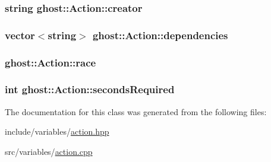 \hypertarget{classghost_1_1Action_ab4862cbb4a415783306abbd1a2c57472}{
\subsubsection[{creator}]{\setlength{\rightskip}{0pt plus 5cm}string ghost\-::\-Action\-::creator\hspace{0.3cm}{\ttfamily [private]}}}\label{classghost_1_1Action_ab4862cbb4a415783306abbd1a2c57472}
\hypertarget{classghost_1_1Action_a0e7e5f84cc8d24bed8d83021602b02c2}{
\subsubsection[{dependencies}]{\setlength{\rightskip}{0pt plus 5cm}vector$<$string$>$ ghost\-::\-Action\-::dependencies\hspace{0.3cm}{\ttfamily [private]}}}\label{classghost_1_1Action_a0e7e5f84cc8d24bed8d83021602b02c2}
\hypertarget{classghost_1_1Action_a040eaa1d69dc99221cbdf48d84ce6edb}{
\subsubsection[{race}]{ ghost\-::\-Action\-::race\hspace{0.3cm}{\ttfamily [private]}}}\label{classghost_1_1Action_a040eaa1d69dc99221cbdf48d84ce6edb}
\hypertarget{classghost_1_1Action_a18e79ee3f861c807dfd8c1b35c2b7a3f}{
\subsubsection[{seconds\-Required}]{\setlength{\rightskip}{0pt plus 5cm}int ghost\-::\-Action\-::seconds\-Required\hspace{0.3cm}{\ttfamily [private]}}}\label{classghost_1_1Action_a18e79ee3f861c807dfd8c1b35c2b7a3f}


The documentation for this class was generated from the following files\-:\begin{DoxyCompactItemize}
\item 
include/variables/\hyperlink{action_8hpp}{action.\-hpp}\item 
src/variables/\hyperlink{action_8cpp}{action.\-cpp}\end{DoxyCompactItemize}
